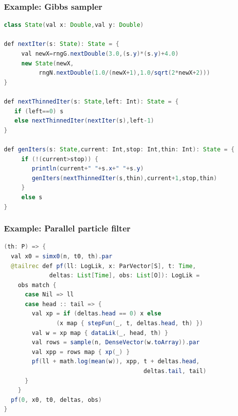 \documentclass[mathserif,handout]{beamer}
\begin{document}
\begin{frame}[fragile]
\frametitle{Example: Gibbs sampler}
{\scriptsize
\begin{lstlisting}[language=java]
class State(val x: Double,val y: Double)
 
def nextIter(s: State): State = {
     val newX=rngG.nextDouble(3.0,(s.y)*(s.y)+4.0)
     new State(newX, 
          rngN.nextDouble(1.0/(newX+1),1.0/sqrt(2*newX+2)))
}
 
def nextThinnedIter(s: State,left: Int): State = {
   if (left==0) s 
   else nextThinnedIter(nextIter(s),left-1)
}
 
def genIters(s: State,current: Int,stop: Int,thin: Int): State = {
     if (!(current>stop)) {
        println(current+" "+s.x+" "+s.y)
        genIters(nextThinnedIter(s,thin),current+1,stop,thin)
     }
     else s
}
\end{lstlisting}
}
\end{frame}

\begin{frame}[fragile]
\frametitle{Example: Parallel particle filter}
{\scriptsize
\begin{lstlisting}[language=java]
(th: P) => {
  val x0 = simx0(n, t0, th).par
  @tailrec def pf(ll: LogLik, x: ParVector[S], t: Time, 
             deltas: List[Time], obs: List[O]): LogLik =
    obs match {
      case Nil => ll
      case head :: tail => {
        val xp = if (deltas.head == 0) x else 
               (x map { stepFun(_, t, deltas.head, th) })
        val w = xp map { dataLik(_, head, th) }
        val rows = sample(n, DenseVector(w.toArray)).par
        val xpp = rows map { xp(_) }
        pf(ll + math.log(mean(w)), xpp, t + deltas.head, 
                                        deltas.tail, tail)
      }
    }
  pf(0, x0, t0, deltas, obs)
}
\end{lstlisting}
}
\end{frame}

\end{document}
